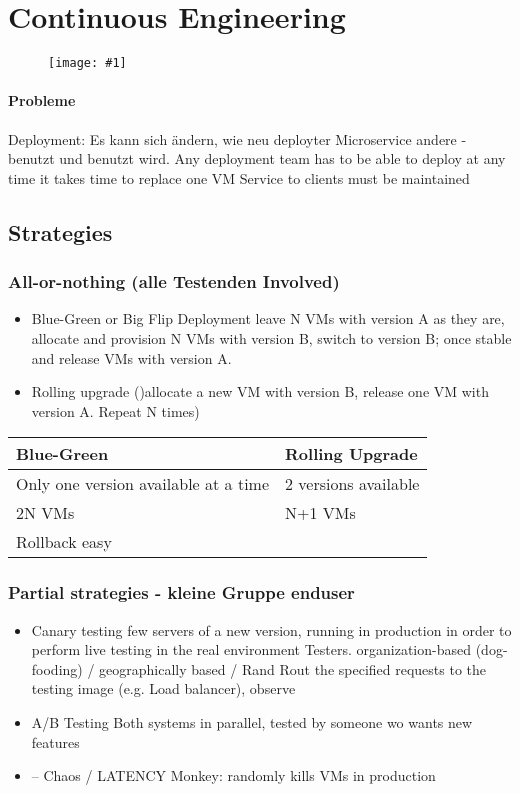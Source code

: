 \documentclass[a4paper,12pt]{article}%
\newcommand{\grafik}[2]{\begin{figure}[!htb]
		\noindent\texttt{[image: \#1]}
		\caption{\textrm{#2}}%
	\end{figure}}
\begin{document}
\newpage
\section{Continuous Engineering}




\grafik{../zusa2/DevOps/02.png}{}
\paragraph{Probleme}
Deployment: Es kann sich ändern, wie neu deployter Microservice andere - benutzt und benutzt wird.
Any deployment team has to be able to deploy at any time
it takes time to replace one VM
Service to clients must be maintained

\subsection{Strategies}
\subsubsection{All-or-nothing (alle Testenden Involved)}
\begin{itemize}
	\item Blue-Green or Big Flip Deployment
	leave N VMs with version A as they are, 
	allocate and provision N VMs with version B, switch to version B; once stable and release VMs with version A.
	\item Rolling upgrade
	()allocate a new VM with version B, release one VM with version A. Repeat N times)
\end{itemize}
\begin{table}[h]
	\centering
	\label{my-label}
	\begin{tabular}{|l|l|}
		\hline
		Blue-Green                           & Rolling Upgrade      \\ \hline
		Only one version available at a time & 2 versions available \\ \hline
		2N VMs                               & N+1 VMs              \\ \hline
		Rollback easy                        &                      \\ \hline
	\end{tabular}
\end{table}

\subsubsection{Partial strategies - kleine Gruppe enduser}
\begin{itemize}
	\item Canary testing
	few servers of a new version, 
	running in production in order to perform live testing in the real environment
	Testers. 
	organization-based (dog-fooding) / geographically based / Rand
	Rout the specified requests to the testing image (e.g. Load balancer), observe
	\item A/B Testing
	Both systems in parallel, tested by someone wo wants new features
	\item – Chaos / LATENCY Monkey: randomly kills VMs in production
\end{itemize}
\newpage
\end{document}
